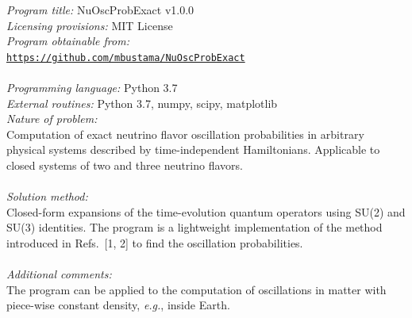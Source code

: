 \documentclass[final,5p,times,twocolumn]{elsarticle}
\newcommand{\eg}{{\it e.g.}}
\begin{document}
\begin{small}

\noindent
{\em Program title:} NuOscProbExact v1.0.0    \\
\smallskip 
{\em Licensing provisions:} MIT License  \\
\smallskip
{\em Program obtainable from:} \\ 
\href{https://github.com/mbustama/NuOscProbExact}{\tt https://github.com/mbustama/NuOscProbExact}  \\ \\
\smallskip
{\em Programming language:} Python 3.7   \\
\smallskip
{\em External routines:} Python 3.7, numpy, scipy, matplotlib   \\
\smallskip
{\em Nature of problem:} \\
Computation of exact neutrino flavor oscillation probabilities in arbitrary physical systems described by time-independent Hamiltonians.  Applicable to closed systems of two and three neutrino flavors. \\ \\
\smallskip
{\em Solution method:}\\
Closed-form expansions of the time-evolution quantum operators using SU(2) and SU(3) identities.  The program is a lightweight implementation of the method introduced in Refs.\ [1, 2] to find the oscillation probabilities. \\ \\
\smallskip
{\em Additional comments:}\\
The program can be applied to the computation of oscillations in matter with piece-wise constant density, \eg, inside Earth.   \\ \\


\end{small}
\end{document}
